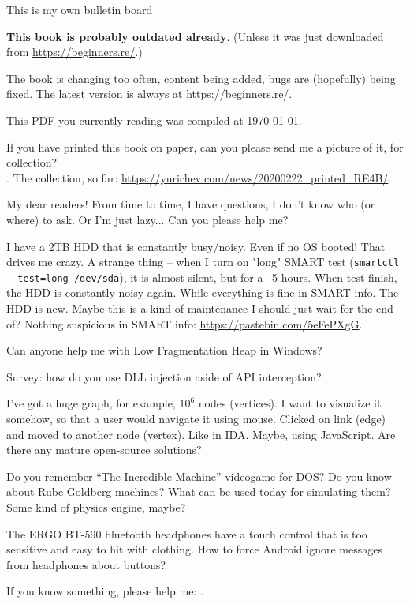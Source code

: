 
\begin{center}
\LARGE{} This is my own bulletin board \normalsize{}
\end{center}

\textbf{This book is probably outdated already}.
(Unless it was just downloaded from \url{https://beginners.re/}.)

The book is \href{\RepoURL/ChangeLog}{changing too often},
content being added, bugs are (hopefully) being fixed.
The latest version is always at \url{https://beginners.re/}.

This PDF you currently reading was compiled at \today{}.

\myhrule{}

If you have printed this book on paper, can you please send me a picture of it, for collection?\\
\EMAILS{}.
The collection, so far: \url{https://yurichev.com/news/20200222_printed_RE4B/}.

\myhrule{}

My dear readers! From time to time, I have questions, I don't know who (or where) to ask.
Or I'm just lazy...
Can you please help me?

\myhrule{}

I have a 2TB HDD that is constantly busy/noisy.
Even if no OS booted!
That drives me crazy.
A strange thing -- when I turn on "long" SMART test (\verb|smartctl --test=long /dev/sda|),
it is almost silent, but for a ~5 hours.
When test finish, the HDD is constantly noisy again.
While everything is fine in SMART info.
The HDD is new.
Maybe this is a kind of maintenance I should just wait for the end of?
Nothing suspicious in SMART info: \url{https://pastebin.com/5eFePXgG}.

\myhrule{}

Can anyone help me with Low Fragmentation Heap in Windows?

\myhrule{}

Survey: how do you use DLL injection aside of API interception?

\myhrule{}

I've got a huge graph, for example, $10^6$ nodes (vertices).
I want to visualize it somehow, so that a user would navigate it using mouse.
Clicked on link (edge) and moved to another node (vertex).
Like in IDA.
Maybe, using JavaScript.
Are there any mature open-source solutions?

\myhrule{}

Do you remember ``The Incredible Machine'' videogame for DOS?
Do you know about Rube Goldberg machines?
What can be used today for simulating them?
Some kind of physics engine, maybe?

\myhrule{}

The ERGO BT-590 bluetooth headphones have a touch control that is too sensitive and easy to hit with clothing.
How to force Android ignore messages from headphones about buttons?

\myhrule{}

If you know something, please help me: \EMAILS{}.


